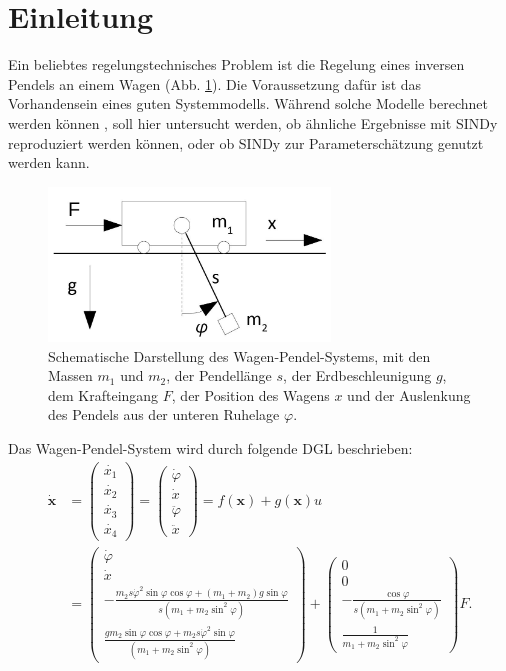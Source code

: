 \section{Einleitung}
Ein beliebtes regelungstechnisches Problem ist die Regelung eines inversen Pendels an einem Wagen (Abb. \ref{fig:wp}). Die Voraussetzung dafür ist das Vorhandensein eines guten Systemmodells. Während solche Modelle berechnet werden können \cite[Softwarebeispiel 3]{Knoll2016}, soll hier untersucht werden, ob ähnliche Ergebnisse mit SINDy reproduziert werden können, oder ob SINDy zur Parameterschätzung genutzt werden kann. 
\begin{figure}[h!] %
	\centering
	\includegraphics[width=75mm]{images/wp.jpg}
	\caption{Schematische Darstellung des Wagen-Pendel-Systems, mit den Massen $m_1$ und $m_2$, der Pendellänge $s$, der Erdbeschleunigung $g$, dem Krafteingang $F$, der Position des Wagens $x$ und der Auslenkung des Pendels aus der unteren Ruhelage $\varphi$.}
	\label{fig:wp}
\end{figure}
Das Wagen-Pendel-System wird durch folgende DGL beschrieben:
\begin{align}
	\dot{\boldsymbol{x}} &= \begin{pmatrix}
		\dot{x_1}  \\
		\dot{x_2}  \\
		\dot{x_3}  \\ 
		\dot{x_4}	
	\end{pmatrix} 	=	\begin{pmatrix}
							\dot{\varphi} \\
							\dot{x}  \\
							\ddot{\varphi}  \\ 
							\ddot{x}
						\end{pmatrix} = f(\boldsymbol{x}) + g(\boldsymbol{x}) u\\
	&=\begin{pmatrix}
		\dot{\varphi}  \\
		\dot{x}  \\
		-\frac{m_2s\dot{\varphi}^2\sin\varphi\cos\varphi + (m_1+m_2)g\sin\varphi}{s(m_1 + m_2\sin^2\varphi)}\\
		\frac{gm_2\sin\varphi\cos\varphi + m_2s\dot{\varphi}^2\sin\varphi}{(m_1+m_2\sin^2\varphi)}   
	\end{pmatrix}		
 +		 \begin{pmatrix}
									0  \\
									0  \\
									-\frac{\cos\varphi}{s(m_1 + m_2\sin^2\varphi)}\\
									\frac{1}{m_1+m_2\sin^2\varphi}   
								\end{pmatrix} F. \label{eq:wp}
\end{align}
